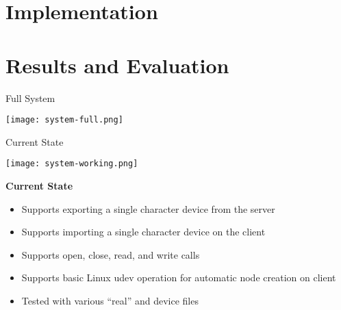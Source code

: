 \documentclass[xcolor=dvipsnames]{beamer}
\begin{document}
\section{Implementation}



\section{Results and Evaluation}

\begin{frame}[c]{Full System}
  \begin{center}
    \texttt{[image: system-full.png]}
  \end{center}
\end{frame}

\begin{frame}[c]{Current State}
  \begin{center}
    \texttt{[image: system-working.png]}
  \end{center}
\end{frame}

\begin{frame}{\bf Current State}

\begin{itemize}
\item Supports exporting a single character device from the server
\item Supports importing a single character device on the client
\item Supports open, close, read, and write calls
\item Supports basic Linux udev operation for automatic node
  creation on client
\item Tested with various ``real'' and device files
\end{itemize}

\end{frame}
\end{document}
